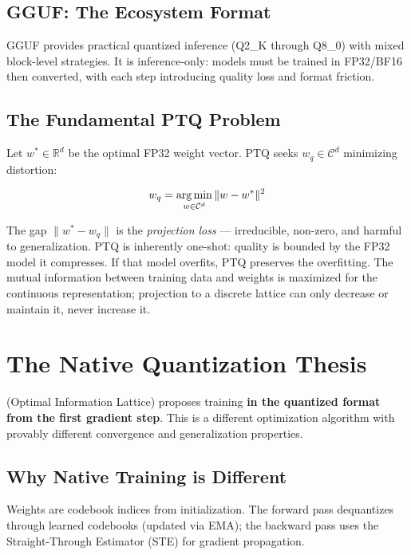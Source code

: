 \subsection{GGUF: The Ecosystem Format}

GGUF provides practical quantized inference (Q2\_K through Q8\_0) with mixed
block-level strategies. It is inference-only: models must be trained in
FP32/BF16 then converted, with each step introducing quality loss and format
friction.

\subsection{The Fundamental PTQ Problem}

Let $w^* \in \mathbb{R}^d$ be the optimal FP32 weight vector. PTQ seeks
$w_q \in \mathcal{C}^d$ minimizing distortion:

\begin{equation}
\label{eq:ptq_projection}
    w_q = \argmin_{w \in \mathcal{C}^d} \|w - w^*\|^2
\end{equation}

The gap $\|w^* - w_q\|$ is the \emph{projection loss} --- irreducible,
non-zero, and harmful to generalization. PTQ is inherently one-shot: quality
is bounded by the FP32 model it compresses. If that model overfits, PTQ
preserves the overfitting. The mutual information between training data and
weights is maximized for the continuous representation; projection to a
discrete lattice can only decrease or maintain it, never increase it.

\section{The Native Quantization Thesis}
\label{sec:native_quantization_thesis}

\OIL{} (Optimal Information Lattice) proposes training \textbf{in the
quantized format from the first gradient step}. This is a different
optimization algorithm with provably different convergence and
generalization properties.

\subsection{Why Native Training is Different}

Weights are codebook indices from initialization. The forward pass
dequantizes through learned codebooks (updated via EMA); the backward pass
uses the Straight-Through Estimator (STE) for gradient propagation.

